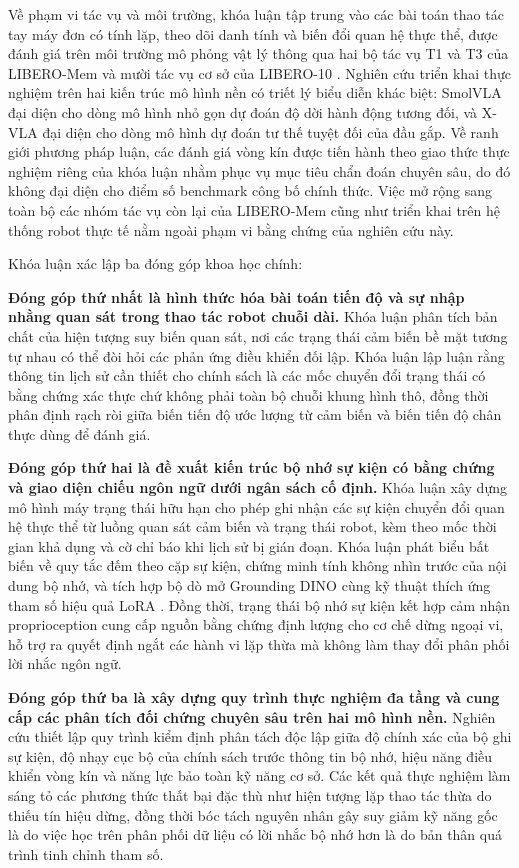 Về phạm vi tác vụ và môi trường, khóa luận tập trung vào các bài toán thao tác tay máy đơn có tính lặp, theo dõi danh tính và biến đổi quan hệ thực thể, được đánh giá trên môi trường mô phỏng vật lý thông qua hai bộ tác vụ T1 và T3 của LIBERO-Mem \cite{liberomemSource} và mười tác vụ cơ sở của LIBERO-10 \cite{liberoSource}. Nghiên cứu triển khai thực nghiệm trên hai kiến trúc mô hình nền có triết lý biểu diễn khác biệt: SmolVLA \cite{smolvla2025} đại diện cho dòng mô hình nhỏ gọn dự đoán độ dời hành động tương đối, và X-VLA \cite{xvla2025} đại diện cho dòng mô hình dự đoán tư thế tuyệt đối của đầu gắp. Về ranh giới phương pháp luận, các đánh giá vòng kín được tiến hành theo giao thức thực nghiệm riêng của khóa luận nhằm phục vụ mục tiêu chẩn đoán chuyên sâu, do đó không đại diện cho điểm số benchmark công bố chính thức. Việc mở rộng sang toàn bộ các nhóm tác vụ còn lại của LIBERO-Mem cũng như triển khai trên hệ thống robot thực tế nằm ngoài phạm vi bằng chứng của nghiên cứu này.

Khóa luận xác lập ba đóng góp khoa học chính:

\textbf{Đóng góp thứ nhất là hình thức hóa bài toán tiến độ và sự nhập nhằng quan sát trong thao tác robot chuỗi dài.} Khóa luận phân tích bản chất của hiện tượng suy biến quan sát, nơi các trạng thái cảm biến bề mặt tương tự nhau có thể đòi hỏi các phản ứng điều khiển đối lập. Khóa luận lập luận rằng thông tin lịch sử cần thiết cho chính sách là các mốc chuyển đổi trạng thái có bằng chứng xác thực chứ không phải toàn bộ chuỗi khung hình thô, đồng thời phân định rạch ròi giữa biến tiến độ ước lượng từ cảm biến và biến tiến độ chân thực dùng để đánh giá.

\textbf{Đóng góp thứ hai là đề xuất kiến trúc bộ nhớ sự kiện có bằng chứng và giao diện chiếu ngôn ngữ dưới ngân sách cố định.} Khóa luận xây dựng mô hình máy trạng thái hữu hạn cho phép ghi nhận các sự kiện chuyển đổi quan hệ thực thể từ luồng quan sát cảm biến và trạng thái robot, kèm theo mốc thời gian khả dụng và cờ chỉ báo khi lịch sử bị gián đoạn. Khóa luận phát biểu bất biến về quy tắc đếm theo cặp sự kiện, chứng minh tính không nhìn trước của nội dung bộ nhớ, và tích hợp bộ dò mở Grounding DINO \cite{groundingdino2024} cùng kỹ thuật thích ứng tham số hiệu quả LoRA \cite{lora2021}. Đồng thời, trạng thái bộ nhớ sự kiện kết hợp cảm nhận proprioception cung cấp nguồn bằng chứng định lượng cho cơ chế dừng ngoại vi, hỗ trợ ra quyết định ngắt các hành vi lặp thừa mà không làm thay đổi phân phối lời nhắc ngôn ngữ.

\textbf{Đóng góp thứ ba là xây dựng quy trình thực nghiệm đa tầng và cung cấp các phân tích đối chứng chuyên sâu trên hai mô hình nền.} Nghiên cứu thiết lập quy trình kiểm định phân tách độc lập giữa độ chính xác của bộ ghi sự kiện, độ nhạy cục bộ của chính sách trước thông tin bộ nhớ, hiệu năng điều khiển vòng kín và năng lực bảo toàn kỹ năng cơ sở. Các kết quả thực nghiệm làm sáng tỏ các phương thức thất bại đặc thù như hiện tượng lặp thao tác thừa do thiếu tín hiệu dừng, đồng thời bóc tách nguyên nhân gây suy giảm kỹ năng gốc là do việc học trên phân phối dữ liệu có lời nhắc bộ nhớ hơn là do bản thân quá trình tinh chỉnh tham số.

